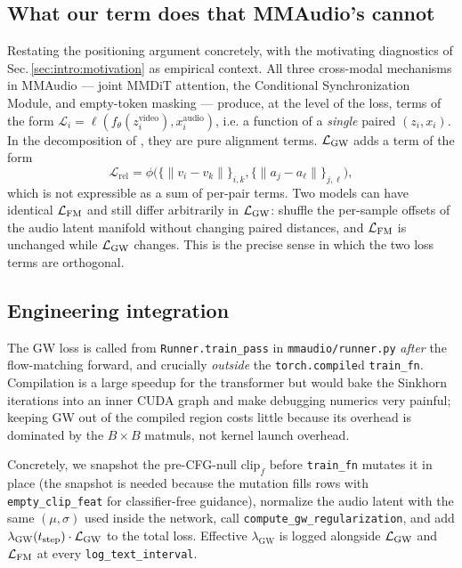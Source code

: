 \subsection{What our term does that MMAudio's cannot}
\label{sec:method:what-changes}
Restating the positioning argument concretely, with the
motivating diagnostics of Sec.\,\ref{sec:intro:motivation} as
empirical context. All three
cross-modal mechanisms in MMAudio --- joint MMDiT attention, the
Conditional Synchronization Module, and empty-token masking ---
produce, at the level of the loss, terms of the form
$\mathcal{L}_i = \ell(f_\theta(z_i^{\text{video}}),
x_i^{\text{audio}})$, i.e. a function of a \emph{single} paired
$(z_i, x_i)$. In the decomposition of
\citet{wang2020understanding}, they are pure alignment terms.
$\mathcal{L}_{\mathrm{GW}}$ adds a term of the form
\[
  \mathcal{L}_{\mathrm{rel}} = \phi\bigl(
    \{ \lVert v_i - v_k \rVert \}_{i,k},
    \{ \lVert a_j - a_\ell \rVert \}_{j,\ell}
  \bigr),
\]
which is not expressible as a sum of per-pair terms. Two models
can have identical $\mathcal{L}_{\mathrm{FM}}$ and still differ arbitrarily in
$\mathcal{L}_{\mathrm{GW}}$: shuffle the per-sample offsets of the audio latent
manifold without changing paired distances, and $\mathcal{L}_{\mathrm{FM}}$ is
unchanged while $\mathcal{L}_{\mathrm{GW}}$ changes. This is the precise sense in
which the two loss terms are orthogonal.

\subsection{Engineering integration}
\label{sec:method:integration}
The GW loss is called from \texttt{Runner.train\_pass} in
\texttt{mmaudio/runner.py} \emph{after} the flow-matching forward,
and crucially \emph{outside} the \texttt{torch.compile}d
\texttt{train\_fn}. Compilation is a large speedup for the
transformer but would bake the Sinkhorn iterations into an inner
CUDA graph and make debugging numerics very painful; keeping GW
out of the compiled region costs little because its overhead is
dominated by the $B{\times}B$ matmuls, not kernel launch overhead.

Concretely, we snapshot the pre-CFG-null $\text{clip}_f$ before
\texttt{train\_fn} mutates it in place (the snapshot is needed
because the mutation fills rows with \texttt{empty\_clip\_feat}
for classifier-free guidance), normalize the audio latent with the
same $(\mu,\sigma)$ used inside the network, call
\texttt{compute\_gw\_regularization}, and add
$\lambda_{\mathrm{GW}}(t_{\text{step}}) \cdot \mathcal{L}_{\mathrm{GW}}$ to the total
loss. Effective $\lambda_{\mathrm{GW}}$ is logged alongside
$\mathcal{L}_{\mathrm{GW}}$ and $\mathcal{L}_{\mathrm{FM}}$ at every \texttt{log\_text\_interval}.
